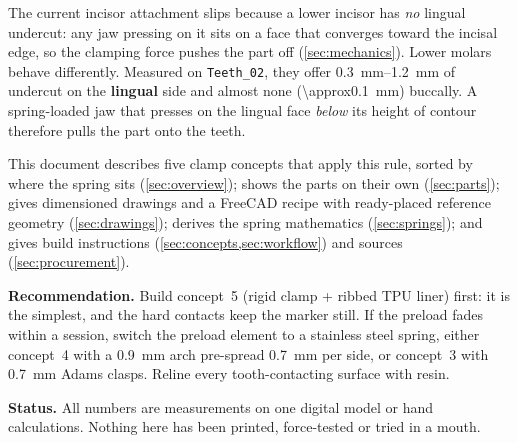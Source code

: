
\begin{keybox}[title={Summary}]
The current incisor attachment slips because a lower incisor has \emph{no} lingual undercut: any
jaw pressing on it sits on a face that converges toward the incisal edge, so the clamping force
pushes the part off (\cref{sec:mechanics}). Lower molars behave differently. Measured on
\texttt{Teeth\_02}, they offer \SIrange{0.3}{1.2}{\milli\metre} of undercut on the
\textbf{lingual} side and almost none (\SI{\approx0.1}{\milli\metre}) buccally. A spring-loaded
jaw that presses on the lingual face \emph{below} its height of contour therefore pulls the part
onto the teeth.

This document describes five clamp concepts that apply this rule, sorted by where the spring
sits (\cref{sec:overview}); shows the parts on their own (\cref{sec:parts}); gives dimensioned
drawings and a FreeCAD recipe with ready-placed reference geometry (\cref{sec:drawings}); derives
the spring mathematics (\cref{sec:springs}); and gives build instructions
(\cref{sec:concepts,sec:workflow}) and sources (\cref{sec:procurement}).

\textbf{Recommendation.} Build concept~5 (rigid clamp + ribbed TPU liner) first: it is the
simplest, and the hard contacts keep the marker still. If the preload fades within a session,
switch the preload element to a stainless steel spring, either concept~4 with a
\SI{0.9}{\milli\metre} arch pre-spread \SI{0.7}{\milli\metre} per side, or concept~3 with
\SI{0.7}{\milli\metre} Adams clasps. Reline every tooth-contacting surface with resin.

\textbf{Status.} All numbers are measurements on one digital model or hand calculations. Nothing
here has been printed, force-tested or tried in a mouth.
\end{keybox}
